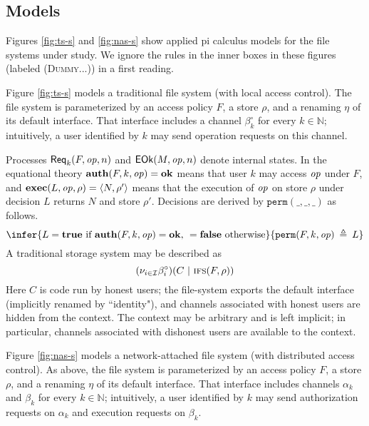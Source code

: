 \documentclass[10pt]{article}
\newcommand{\func}[1]{{\bf #1}}
\newcommand{\op}{{\it op}}
\newcommand{\tup}[1]{\langle #1\rangle}
\newcommand{\Req}{\mathsf{Req}}
\newcommand{\Comm}{\mathsf{EOk}}
\newcommand{\betac}{\beta^\circ}
\begin{document}
\subsection{Models}

Figures \ref{fig:ts-s} and \ref{fig:nas-s} show applied pi calculus models for the file systems under study. We ignore the rules in the inner boxes in these figures (labeled (\textsc{Dummy}...)) in a first reading.

Figure \ref{fig:ts-s} models a traditional file system (with local access control). The file system is parameterized by an access policy $F$, a store $\rho$, and a renaming $\eta$ of its default interface. That interface includes a channel $\betac_k$ for every $k \in \mathbb N$; intuitively, a user identified by $k$ may send operation requests on this channel. 

Processes $\Req_k(F,\op,n)$ and $\Comm(M,\op,n)$ denote internal states. 
In the equational theory $\func{auth}(F,k,\op) = \func{ok}$ means that user $k$ may access $\op$ under $F$, and $\func{exec}(L,\op,\rho) = \tup{N,\rho'}$ means that the execution of $\op$ on store $\rho$ under decision $L$ returns $N$ and store $\rho'$. Decisions are derived by $\mathtt{perm}(\_,\_,\_)$ as follows.
$$\infer
	{L = \func{true}\mbox{ if }\func{auth}(F,k,\op) = \func{ok}\mbox{, }=\func{false}\mbox{ otherwise}}
	{\mathtt{perm}(F,k,\op) \:\triangleq\: L}
$$
A traditional storage system may be described as 
$$(\nu_{i \in \mathcal I}\betac_i)(C~|~\textsc{ifs}(F,\rho))$$
Here $C$ is code run by honest users; the file-system exports the default interface (implicitly renamed by ``identity"), and channels associated with honest users are hidden from the context. The context may be arbitrary and is left implicit; in particular, channels associated with dishonest users are available to the context.

Figure \ref{fig:nas-s} models a network-attached file system (with distributed access control). As above, the file system is parameterized by an access policy $F$, a store $\rho$, and a renaming $\eta$ of its default interface. That interface includes channels $\alpha_k$ and $\beta_k$ for every $k \in \mathbb N$; intuitively, a user identified by $k$ may send authorization requests on $\alpha_k$ and execution requests on $\beta_k$. 
\end{document}
